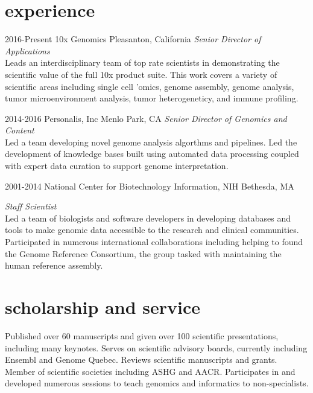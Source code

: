 \documentclass[]{dmc-cv} %
\begin{document}
\section{experience}

\begin{entrylist}


\entry
{2016-Present}
{10x Genomics}
{Pleasanton, California}
{\emph{Senior Director of Applications} \\
Leads an interdisciplinary team of top rate scientists in demonstrating the scientific value of the full
10x product suite. This work covers a variety of scientific areas including single cell 'omics, genome assembly, genome analysis,
tumor microenvironment analysis, tumor heterogeneticy, and immune profiling.
}

\entry
{2014-2016}
{Personalis, Inc}
{Menlo Park, CA}
{\emph{Senior Director of Genomics and Content} \\
Led a team developing novel genome analysis algorthms and pipelines. Led the development of knowledge bases built using automated data processing coupled with expert data curation to support genome interpretation.
}

\entry
{2001-2014}
{National Center for Biotechnology Information, NIH}
{Bethesda, MA}
{\emph{Staff Scientist} \\
Led a team of biologists and software developers in developing databases and tools to make genomic data accessible to the research and clinical communities. Participated in numerous international collaborations including helping to found the Genome Reference Consortium, the group tasked with maintaining the human reference assembly.

}

\end{entrylist}


\section{scholarship and service}
Published over 60 manuscripts and given over 100 scientific presentations, including many keynotes. Serves on scientific advisory boards, currently including Ensembl and Genome Quebec. Reviews scientific manuscripts and grants. Member of scientific societies including ASHG and AACR. Participates in and developed numerous sessions to teach genomics and informatics to non-specialists.
\end{document}
